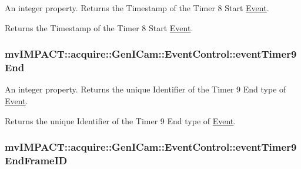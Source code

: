 An integer property. Returns the Timestamp of the Timer 8 Start \hyperlink{classmv_i_m_p_a_c_t_1_1acquire_1_1_event}{Event}. 

Returns the Timestamp of the Timer 8 Start \hyperlink{classmv_i_m_p_a_c_t_1_1acquire_1_1_event}{Event}. \hypertarget{classmv_i_m_p_a_c_t_1_1acquire_1_1_gen_i_cam_1_1_event_control_a1af5ba37c4b4b3eb094b2048e2399eb5}{
\subsubsection[{event\+Timer9\+End}]{ mv\+I\+M\+P\+A\+C\+T\+::acquire\+::\+Gen\+I\+Cam\+::\+Event\+Control\+::event\+Timer9\+End}}\label{classmv_i_m_p_a_c_t_1_1acquire_1_1_gen_i_cam_1_1_event_control_a1af5ba37c4b4b3eb094b2048e2399eb5}


An integer property. Returns the unique Identifier of the Timer 9 End type of \hyperlink{classmv_i_m_p_a_c_t_1_1acquire_1_1_event}{Event}. 

Returns the unique Identifier of the Timer 9 End type of \hyperlink{classmv_i_m_p_a_c_t_1_1acquire_1_1_event}{Event}. \hypertarget{classmv_i_m_p_a_c_t_1_1acquire_1_1_gen_i_cam_1_1_event_control_ae7670b9a9130d19f149c757600ce0a93}{
\subsubsection[{event\+Timer9\+End\+Frame\+I\+D}]{ mv\+I\+M\+P\+A\+C\+T\+::acquire\+::\+Gen\+I\+Cam\+::\+Event\+Control\+::event\+Timer9\+End\+Frame\+I\+D}}\label{classmv_i_m_p_a_c_t_1_1acquire_1_1_gen_i_cam_1_1_event_control_ae7670b9a9130d19f149c757600ce0a93}



